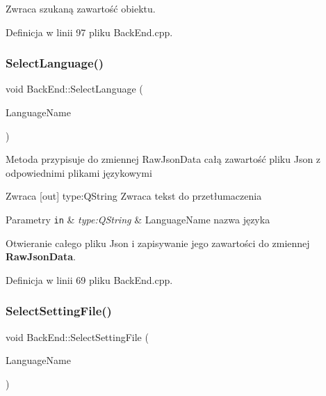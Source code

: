 Zwraca szukaną zawartość obiektu. 

Definicja w linii 97 pliku Back\+End.\+cpp.

\mbox{\label{class_back_end_space_1_1_back_end_a3a85c4416c934c36b89aed4e371c82a8}} 
\subsubsection{\texorpdfstring{Select\+Language()}{SelectLanguage()}}
{\footnotesize\ttfamily void Back\+End\+::\+Select\+Language (\begin{DoxyParamCaption}\item[{Q\+String}]{Language\+Name }\end{DoxyParamCaption})}

Metoda przypisuje do zmiennej Raw\+Json\+Data całą zawartość pliku Json z odpowiednimi plikami językowymi \begin{DoxyReturn}{Zwraca}
\mbox{[}out\mbox{]} type\+:Q\+String Zwraca tekst do przetłumaczenia 
\end{DoxyReturn}

\begin{DoxyParams}[1]{Parametry}
\mbox{\tt in}  & {\em type\+:\+Q\+String} & Language\+Name nazwa języka \\
\hline
\end{DoxyParams}
Otwieranie całego pliku Json i zapisywanie jego zawartości do zmiennej {\bfseries Raw\+Json\+Data}. 

Definicja w linii 69 pliku Back\+End.\+cpp.

\mbox{\label{class_back_end_space_1_1_back_end_a1c2234acf04382bdaf5adf2921a0ae65}} 
\subsubsection{\texorpdfstring{Select\+Setting\+File()}{SelectSettingFile()}}
{\footnotesize\ttfamily void Back\+End\+::\+Select\+Setting\+File (\begin{DoxyParamCaption}\item[{Q\+String}]{Language\+Name }\end{DoxyParamCaption})}

